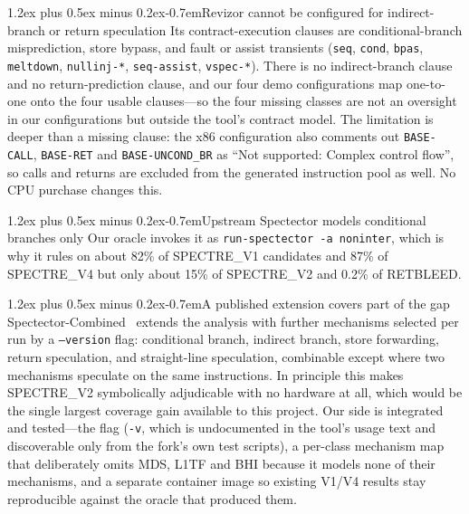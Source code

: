 \documentclass[conference]{IEEEtran}
\makeatletter
\renewcommand\paragraph{\@startsection{paragraph}{4}{\z@}%
  {1.2ex plus 0.5ex minus 0.2ex}{-0.7em}{\normalfont\normalsize\bfseries}}
\makeatother
\begin{document}
\paragraph{Revizor cannot be configured for indirect-branch or return
speculation} Its contract-execution clauses are conditional-branch
misprediction, store bypass, and fault or assist transients
(\texttt{seq}, \texttt{cond}, \texttt{bpas}, \texttt{meltdown},
\texttt{nullinj-*}, \texttt{seq-assist}, \texttt{vspec-*}). There is no
indirect-branch clause and no return-prediction clause, and our four demo
configurations map one-to-one onto the four usable clauses---so the four
missing classes are not an oversight in our configurations but outside the
tool's contract model. The limitation is deeper than a missing clause: the x86
configuration also comments out \texttt{BASE-CALL}, \texttt{BASE-RET} and
\texttt{BASE-UNCOND\_BR} as ``Not supported: Complex control flow'', so calls
and returns are excluded from the generated instruction pool as well. No CPU
purchase changes this.

\paragraph{Upstream Spectector models conditional branches only} Our oracle
invokes it as \texttt{run-spectector -a noninter}, which is why it rules on
about 82\% of SPECTRE\_V1 candidates and 87\% of SPECTRE\_V4 but only about
15\% of SPECTRE\_V2 and 0.2\% of RETBLEED.

\paragraph{A published extension covers part of the gap}
Spectector-Combined~\cite{fabian2022} extends the analysis with further
mechanisms selected per run by a \texttt{--version} flag: conditional branch,
indirect branch, store forwarding, return speculation, and straight-line
speculation, combinable except where two mechanisms speculate on the same
instructions. In principle this makes SPECTRE\_V2 symbolically adjudicable with no hardware
at all, which would be the single largest coverage gain available to this
project. Our side is integrated and tested---the flag (\texttt{-v}, which is
undocumented in the tool's usage text and discoverable only from the fork's own
test scripts), a per-class mechanism map that deliberately omits MDS, L1TF and
BHI because it models none of their mechanisms, and a separate container image
so existing V1/V4 results stay reproducible against the oracle that produced
them.
\end{document}
